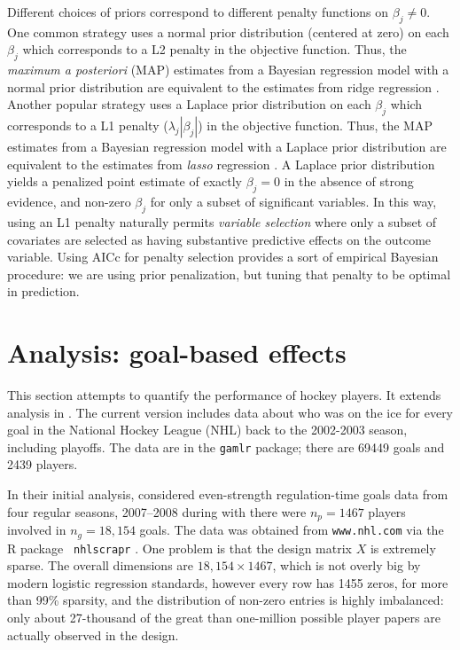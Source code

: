 Different choices of priors correspond to different penalty functions on
$\beta_j \ne 0$. One common strategy uses a normal prior distribution
(centered at zero) on each $\beta_j$ which corresponds to a L2 penalty in the
objective function.  Thus, the {\em maximum a posteriori} (MAP) estimates from
a Bayesian regression model with a normal prior distribution are equivalent to
the estimates from ridge regression \cite{HoeKen70}. Another popular strategy
uses a Laplace prior distribution on each $\beta_j$ which corresponds to a L1
penalty ($\lambda_j |\beta_j|$) in the objective function.  Thus, the MAP
estimates from a Bayesian regression model with a Laplace prior distribution
are equivalent to the estimates from {\it lasso} regression \cite{Tib96}.  A
Laplace prior distribution yields a penalized point estimate of exactly
$\beta_j=0$ in the absence of strong evidence, and non-zero $\beta_j$ for only
a subset of significant variables.  In this way, using an L1 penalty naturally
permits {\it variable selection} where only a subset of covariates are
selected as having substantive predictive effects on the outcome variable.
Using AICc for penalty selection provides a sort of empirical Bayesian procedure: we are using prior penalization, but tuning that penalty to be optimal in prediction.


\section{Analysis: goal-based effects}
\label{sec:goals}


This section attempts to quantify the
performance of hockey players.  It extends  analysis in
\cite{gramacy_estimating_2013}.  The current version includes data about who
was on the ice for every goal in the National Hockey League (NHL) back to the
2002-2003 season, including playoffs.  The data
are in the {\tt gamlr} package; there are
69449 goals and 2439 players.

In their
initial analysis, \cite{gramacy:jensen:taddy:2013} considered even-strength
regulation-time goals data from four regular seasons, 2007--2008 during
with there were $n_p = 1467$ players involved in $n_g = 18,\!154$ goals.  The
data was obtained from \verb!www.nhl.com! via the {\sf R} package {\tt
nhlscrapr} \cite{nhlscrapr}. One problem is that the design matrix $X$ is
extremely sparse. The overall dimensions are $18,\!154 \times 1467$, which is
not overly big by modern logistic regression standards, however every row
has 1455 zeros, for more than 99\% sparsity, and the distribution of non-zero
entries is highly imbalanced: only about 27-thousand of the great than
one-million possible player papers are actually observed in the design.  

